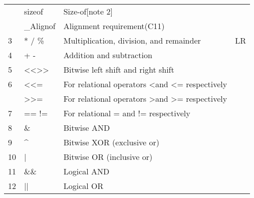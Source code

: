 \documentclass{extarticle}
\begin{document}
\begin{tabular}{|l|l|l|l|}
               & sizeof                                                & Size-of{[}note 2{]}                                                    &               \\
               & \_Alignof                                             & Alignment requirement(C11)                                             &               \\ \hline
3              & * / \%                                                & Multiplication, division, and remainder                                & LR            \\ \hline
4              & + -                                                   & Addition and subtraction                                               &               \\ \hline
5              & \textless{}\textless \textgreater{}\textgreater{}     & Bitwise left shift and right shift                                     &               \\ \hline
6              & \textless \textless{}=                                & For relational operators \textless and \textless{}= respectively       &               \\ \hline
               & \textgreater \textgreater{}=                          & For relational operators \textgreater and \textgreater{}= respectively &               \\ \hline
7              & == !=                                                 & For relational = and != respectively                                   &               \\ \hline
8              & \&                                                    & Bitwise AND                                                            &               \\ \hline
9              & \textasciicircum{}                                    & Bitwise XOR (exclusive or)                                             &               \\ \hline
10             & |                                                     & Bitwise OR (inclusive or)                                              &               \\ \hline
11             & \&\&                                                  & Logical AND                                                            &               \\ \hline
12             & ||                                                    & Logical OR                                                             &               \\ \hline

\end{tabular}
\end{document}

